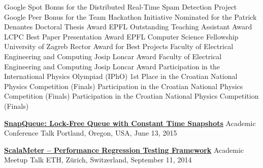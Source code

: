 \documentclass[9pt]{article}
\begin{document}
\bigskip

\medskip
\medskip
\medskip


\noindent Google Spot Bonus for the Distributed Real-Time Spam Detection Project
\newline\noindent Google Peer Bonus for the Team Hackathon Initiative 
\newline\noindent Nominated for the Patrick Denantes Doctoral Thesis Award 
\newline\noindent EPFL Outstanding Teaching Assistant Award 
\newline\noindent LCPC Best Paper Presentation Award 
\newline\noindent EPFL Computer Science Fellowship 
\newline\noindent University of Zagreb Rector Award for Best Projects 
\newline\noindent Faculty of Electrical Engineering and Computing Josip Loncar Award
\newline\noindent Faculty of Electrical Engineering and Computing Josip Loncar Award
\newline\noindent Participation in the International Physics Olympiad (IPhO)
\newline\noindent 1st Place in the Croatian National Physics Competition (Finals)
\newline\noindent Participation in the Croatian National Physics Competition (Finals)
\newline\noindent Participation in the Croatian National Physics Competition (Finals)

\bigskip

\medskip
{}

\vspace{-0.02in}

\noindent\href{http://axel22.github.io/slides/snapq.html#/}
{\bf SnapQueue: Lock-Free Queue with Constant Time Snapshots}
\vspace{-0.03in}
\newline\noindent Academic Conference Talk
\dates{}
\linebreak\noindent Portland, Oregon, USA, June 13, 2015
\bigskip

\noindent\href{https://speakerdeck.com/axel22/scalameter-in-2014}
{\bf ScalaMeter -- Performance Regression Testing Framework}
\vspace{-0.03in}
\newline\noindent Academic Meetup Talk
\dates{}
\linebreak\noindent ETH, Zürich, Switzerland, September 11, 2014
\bigskip
\end{document}
